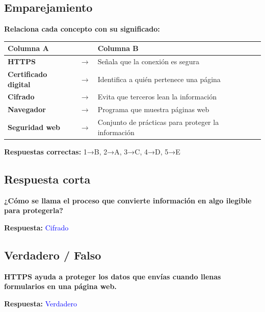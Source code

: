 \vspace{0.4cm}

\subsection{Emparejamiento}

\begin{tcolorbox}[title=\textbf{Pregunta 3: Relación de columnas}]
\textbf{Relaciona cada concepto con su significado:}

\begin{center}
\renewcommand{\arraystretch}{1.3}
\begin{tabular}{>{\bfseries}m{3cm} c m{8cm}}
\textbf{Columna A} & & \textbf{Columna B} \\
\hline
HTTPS & $\rightarrow$ & Señala que la conexión es segura \\
Certificado digital & $\rightarrow$ & Identifica a quién pertenece una página \\
Cifrado & $\rightarrow$ & Evita que terceros lean la información \\
Navegador & $\rightarrow$ & Programa que muestra páginas web \\
Seguridad web & $\rightarrow$ & Conjunto de prácticas para proteger la información \\
\end{tabular}
\end{center}

\textbf{Respuestas correctas:}  
1→B, 2→A, 3→C, 4→D, 5→E
\end{tcolorbox}

\vspace{0.4cm}

\subsection{Respuesta corta}

\begin{tcolorbox}[title=\textbf{Pregunta 4: Respuesta corta}]
\textbf{¿Cómo se llama el proceso que convierte información en algo ilegible para protegerla?}

\textbf{Respuesta:} \textcolor{blue}{Cifrado}
\end{tcolorbox}

\vspace{0.4cm}

\subsection{Verdadero / Falso}

\begin{tcolorbox}[title=\textbf{Pregunta 5: Verdadero/Falso}]
\textbf{HTTPS ayuda a proteger los datos que envías cuando llenas formularios en una página web.}

\textbf{Respuesta:} \textcolor{blue}{Verdadero}
\end{tcolorbox}
